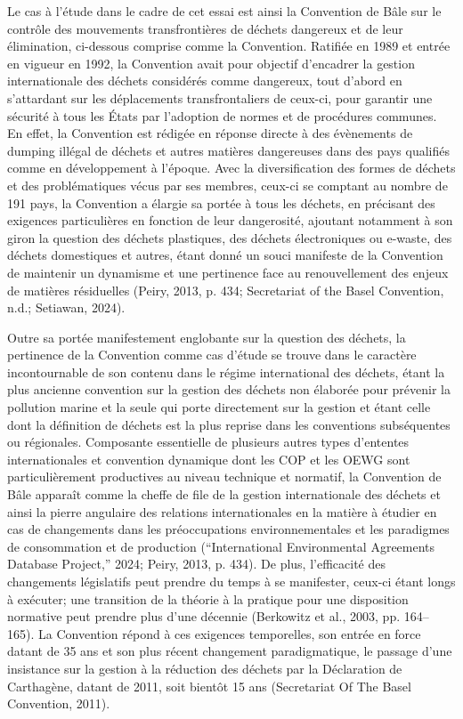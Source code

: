 \documentclass[12pt]{ulaval}
\begin{document}
Le cas à l'étude dans le cadre de cet essai est ainsi la Convention de Bâle sur le contrôle des mouvements transfrontières de déchets dangereux et de leur élimination, ci-dessous comprise comme la Convention. Ratifiée en 1989 et entrée en vigueur en 1992, la Convention avait pour objectif d'encadrer la gestion internationale des déchets considérés comme dangereux, tout d'abord en s'attardant sur les déplacements transfrontaliers de ceux-ci, pour garantir une sécurité à tous les États par l'adoption de normes et de procédures communes. En effet, la Convention est rédigée en réponse directe à des évènements de dumping illégal de déchets et autres matières dangereuses dans des pays qualifiés comme en développement à l'époque. Avec la diversification des formes de déchets et des problématiques vécus par ses membres, ceux-ci se comptant au nombre de 191 pays, la Convention a élargie sa portée à tous les déchets, en précisant des exigences particulières en fonction de leur dangerosité, ajoutant notamment à son giron la question des déchets plastiques, des déchets électroniques ou e-waste, des déchets domestiques et autres, étant donné un souci manifeste de la Convention de maintenir un dynamisme et une pertinence face au renouvellement des enjeux de matières résiduelles (Peiry, 2013, p. 434; Secretariat of the Basel Convention, n.d.; Setiawan, 2024).

Outre sa portée manifestement englobante sur la question des déchets, la pertinence de la Convention comme cas d'étude se trouve dans le caractère incontournable de son contenu dans le régime international des déchets, étant la plus ancienne convention sur la gestion des déchets non élaborée pour prévenir la pollution marine et la seule qui porte directement sur la gestion et étant celle dont la définition de déchets est la plus reprise dans les conventions subséquentes ou régionales. Composante essentielle de plusieurs autres types d'ententes internationales et convention dynamique dont les COP et les OEWG sont particulièrement productives au niveau technique et normatif, la Convention de Bâle apparaît comme la cheffe de file de la gestion internationale des déchets et ainsi la pierre angulaire des relations internationales en la matière à étudier en cas de changements dans les préoccupations environnementales et les paradigmes de consommation et de production ({``International {Environmental} {Agreements} {Database} {Project},''} 2024; Peiry, 2013, p. 434). De plus, l'efficacité des changements législatifs peut prendre du temps à se manifester, ceux-ci étant longs à exécuter; une transition de la théorie à la pratique pour une disposition normative peut prendre plus d'une décennie (Berkowitz et al., 2003, pp. 164--165). La Convention répond à ces exigences temporelles, son entrée en force datant de 35 ans et son plus récent changement paradigmatique, le passage d'une insistance sur la gestion à la réduction des déchets par la Déclaration de Carthagène, datant de 2011, soit bientôt 15 ans (Secretariat Of The Basel Convention, 2011).
\end{document}
